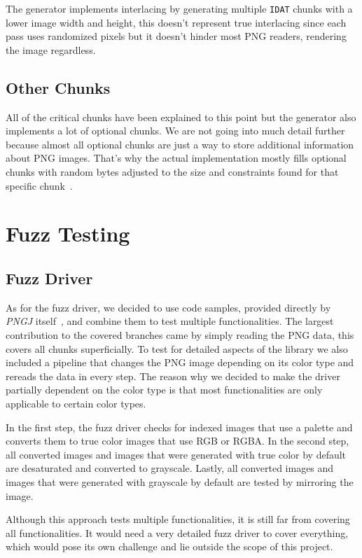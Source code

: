 \documentclass[runningheads]{llncs}
\begin{document}
The generator implements interlacing by generating multiple \texttt{IDAT} chunks with a lower image width and height, this doesn't represent true interlacing since each pass uses randomized pixels but it doesn't hinder most PNG readers, rendering the image regardless.
\subsection{Other Chunks}
All of the critical chunks have been explained to this point but the generator also implements a lot of optional chunks. 
We are not going into much detail further because almost all optional chunks are just a way to store additional information about PNG images.
That's why the actual implementation mostly fills optional chunks with random bytes adjusted to the size and constraints found for that specific chunk~\cite{libpng_chunks}.
\section{Fuzz Testing}
\subsection{Fuzz Driver}
As for the fuzz driver, we decided to use code samples, provided directly by \textit{PNGJ} itself~\cite{PNGJ_samples}, and combine them to test multiple functionalities.
The largest contribution to the covered branches came by simply reading the PNG data, this covers all chunks superficially.
To test for detailed aspects of the library we also included a pipeline that changes the PNG image depending on its color type and rereads the data in every step.
The reason why we decided to make the driver partially dependent on the color type is that most functionalities are only applicable to certain color types.

In the first step, the fuzz driver checks for indexed images that use a palette and converts them to true color images that use RGB or RGBA. 
In the second step, all converted images and images that were generated with true color by default are desaturated and converted to grayscale.
Lastly, all converted images and images that were generated with grayscale by default are tested by mirroring the image.

Although this approach tests multiple functionalities, it is still far from covering all functionalities.
It would need a very detailed fuzz driver to cover everything, which would pose its own challenge and lie outside the scope of this project.
\end{document}
